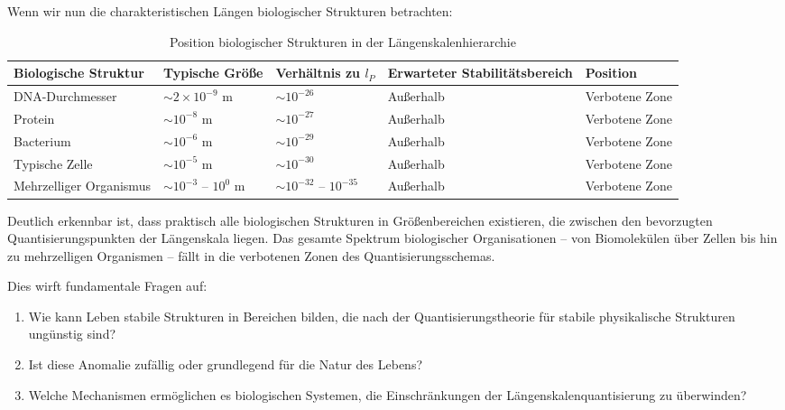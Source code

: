 \documentclass[12pt,a4paper]{article}
\begin{document}
	Wenn wir nun die charakteristischen Längen biologischer Strukturen betrachten:
	
	\begin{table}[h]
		\centering
		\begin{adjustbox}{scale=0.7}
			\begin{tabular}{lllll}
				\hline
				\textbf{Biologische Struktur} & \textbf{Typische Größe} & \textbf{Verhältnis zu $l_P$} & \textbf{Erwarteter Stabilitätsbereich} & \textbf{Position} \\
				\hline
				DNA-Durchmesser & $\sim 2 \times 10^{-9}$ m & $\sim 10^{-26}$ & Außerhalb & Verbotene Zone \\
				Protein & $\sim 10^{-8}$ m & $\sim 10^{-27}$ & Außerhalb & Verbotene Zone \\
				Bacterium & $\sim 10^{-6}$ m & $\sim 10^{-29}$ & Außerhalb & Verbotene Zone \\
				Typische Zelle & $\sim 10^{-5}$ m & $\sim 10^{-30}$ & Außerhalb & Verbotene Zone \\
				Mehrzelliger Organismus & $\sim 10^{-3}$ – $10^{0}$ m & $\sim 10^{-32}$ – $10^{-35}$ & Außerhalb & Verbotene Zone \\
				\hline
			\end{tabular}
		\end{adjustbox}
		\caption{Position biologischer Strukturen in der Längen\-skalen\-hierarchie}
		\label{tab:bio_structures}
	\end{table}
	
	Deutlich erkennbar ist, dass praktisch alle biologischen Strukturen in Größen\-bereichen existieren, die zwischen den bevorzugten Quantisierungs\-punkten der Längen\-skala liegen. Das gesamte Spektrum biologischer Organisationen – von Biomolekülen über Zellen bis hin zu mehrzelligen Organismen – fällt in die \glqq verbotenen Zonen\grqq{} des Quantisierungs\-schemas.
	
	Dies wirft fundamentale Fragen auf:
	\begin{enumerate}
		\item Wie kann Leben stabile Strukturen in Bereichen bilden, die nach der Quantisierungs\-theorie für stabile physikalische Strukturen ungünstig sind?
		\item Ist diese Anomalie zufällig oder grundlegend für die Natur des Lebens?
		\item Welche Mechanismen ermöglichen es biologischen Systemen, die Einschränkungen der Längen\-skalen\-quantisierung zu überwinden?
	\end{enumerate}
	
\end{document}
